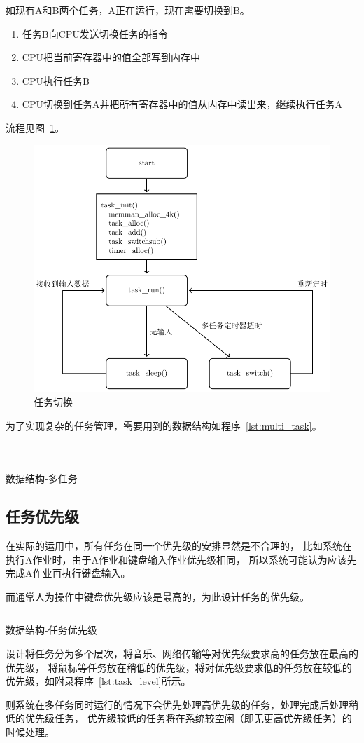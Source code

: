 如现有A和B两个任务，A正在运行，现在需要切换到B。
\begin{enumerate}
\item 任务B向CPU发送切换任务的指令
\item CPU把当前寄存器中的值全部写到内存中
\item CPU执行任务B
\item CPU切换到任务A并把所有寄存器中的值从内存中读出来，继续执行任务A
\end{enumerate}
流程见图~\ref{fig:tasksw}。
\begin{figure}[H]
  \centering
  \includegraphics[width=.7\textwidth]{fig/func/multi.pdf}
  \caption{任务切换}
  \label{fig:tasksw}
\end{figure}

为了实现复杂的任务管理，需要用到的数据结构如程序~\ref{lst:multi_task}。
\begin{listing}[H]
  \inputminted[tabsize=2, firstline=227, lastline=232,
    linenos=true]{c}{../ZOS/src/kernel/bootpack.h}
  \inputminted[tabsize=2, firstline=222, lastline=226,
    linenos=true]{c}{../ZOS/src/kernel/bootpack.h}
  \inputminted[tabsize=2, firstline=209, lastline=221,
    linenos=true]{c}{../ZOS/src/kernel/bootpack.h}
  \caption{数据结构-多任务}
  \label{lst:multi_task}
\end{listing}

\subsection{任务优先级}

在实际的运用中，所有任务在同一个优先级的安排显然是不合理的，
比如系统在执行A作业时，由于A作业和键盘输入作业优先级相同，
所以系统可能认为应该先完成A作业再执行键盘输入。

而通常人为操作中键盘优先级应该是最高的，为此设计任务的优先级。

\begin{listing}[H]
  \inputminted[tabsize=2, firstline=222, lastline=226,
    linenos=true]{c}{../ZOS/src/kernel/bootpack.h}
  \caption{数据结构-任务优先级}
  \label{lst:task_level}
\end{listing}

设计将任务分为多个层次，将音乐、网络传输等对优先级要求高的任务放在最高的优先级，
将鼠标等任务放在稍低的优先级，将对优先级要求低的任务放在较低的优先级，如附录程序~\ref{lst:task_level}所示。

则系统在多任务同时运行的情况下会优先处理高优先级的任务，处理完成后处理稍低的优先级任务，
优先级较低的任务将在系统较空闲（即无更高优先级任务）的时候处理。